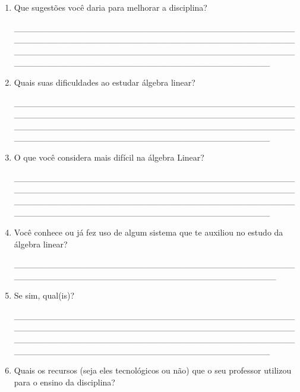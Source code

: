 \begin{enumerate}
\item Que sugestões você daria para melhorar a disciplina?

\_\_\_\_\_\_\_\_\_\_\_\_\_\_\_\_\_\_\_\_\_\_\_\_\_\_\_\_\_\_\_\_\_\_\_\_\_\_\_\_\_\_\_\_\_\_\_\_\_\_\_\_\_\_\_\_\_\_\_\_\_\_\_\_\_\_\_\_\_\_\_\_\_\_\_\_\_\_\_\_\_\_\_\_\_\_\_\_\_\_\_\_\_\_\_\_\_\_\_\_\_\_\_\_\_\_\_\_\_\_\_\_\_\_\_\_\_\_\_\_\_\_\_\_\_\_\_\_\_\_\_\_\_\_\_\_\_\_\_\_\_\_\_\_\_\_\_\_\_\_\_\_\_\_\_\_\_\_\_\_\_\_\_\_\_\_\_\_\_\_\_\_\_\_\_\_

\item Quais suas dificuldades ao estudar álgebra linear?

\_\_\_\_\_\_\_\_\_\_\_\_\_\_\_\_\_\_\_\_\_\_\_\_\_\_\_\_\_\_\_\_\_\_\_\_\_\_\_\_\_\_\_\_\_\_\_\_\_\_\_\_\_\_\_\_\_\_\_\_\_\_\_\_\_\_\_\_\_\_\_\_\_\_\_\_\_\_\_\_\_\_\_\_\_\_\_\_\_\_\_\_\_\_\_\_\_\_\_\_\_\_\_\_\_\_\_\_\_\_\_\_\_\_\_\_\_\_\_\_\_\_\_\_\_\_\_\_\_\_\_\_\_\_\_\_\_\_\_\_\_\_\_\_\_\_\_\_\_\_\_\_\_\_\_\_\_\_\_\_\_\_\_\_\_\_\_\_\_\_\_\_\_\_\_\_

\item O que você considera mais difícil na álgebra Linear? 

\_\_\_\_\_\_\_\_\_\_\_\_\_\_\_\_\_\_\_\_\_\_\_\_\_\_\_\_\_\_\_\_\_\_\_\_\_\_\_\_\_\_\_\_\_\_\_\_\_\_\_\_\_\_\_\_\_\_\_\_\_\_\_\_\_\_\_\_\_\_\_\_\_\_\_\_\_\_\_\_\_\_\_\_\_\_\_\_\_\_\_\_\_\_\_\_\_\_\_\_\_\_\_\_\_\_\_\_\_\_\_\_\_\_\_\_\_\_\_\_\_\_\_\_\_\_\_\_\_\_\_\_\_\_\_\_\_\_\_\_\_\_\_\_\_\_\_\_\_\_\_\_\_\_\_\_\_\_\_\_\_\_\_\_\_\_\_\_\_\_\_\_\_\_\_\_

\item Você conhece ou já fez uso de algum sistema que te auxiliou no estudo da álgebra linear? 

\_\_\_\_\_\_\_\_\_\_\_\_\_\_\_\_\_\_\_\_\_\_\_\_\_\_\_\_\_\_\_\_\_\_\_\_\_\_\_\_\_\_\_\_\_\_\_\_\_\_\_\_\_\_\_\_\_\_\_\_\_\_\_\_\_\_\_\_\_\_\_\_\_\_\_\_\_\_\_\_\_\_\_\_\_\_\_

\item Se sim, qual(is)?

\_\_\_\_\_\_\_\_\_\_\_\_\_\_\_\_\_\_\_\_\_\_\_\_\_\_\_\_\_\_\_\_\_\_\_\_\_\_\_\_\_\_\_\_\_\_\_\_\_\_\_\_\_\_\_\_\_\_\_\_\_\_\_\_\_\_\_\_\_\_\_\_\_\_\_\_\_\_\_\_\_\_\_\_\_\_\_\_\_\_\_\_\_\_\_\_\_\_\_\_\_\_\_\_\_\_\_\_\_\_\_\_\_\_\_\_\_\_\_\_\_\_\_\_\_\_\_\_\_\_\_\_\_\_\_\_\_\_\_\_\_\_\_\_\_\_\_\_\_\_\_\_\_\_\_\_\_\_\_\_\_\_\_\_\_\_\_\_\_\_\_\_\_\_\_\_

\item Quais os recursos (seja eles tecnológicos ou não) que o seu professor utilizou para o ensino da disciplina?


\end{enumerate}
